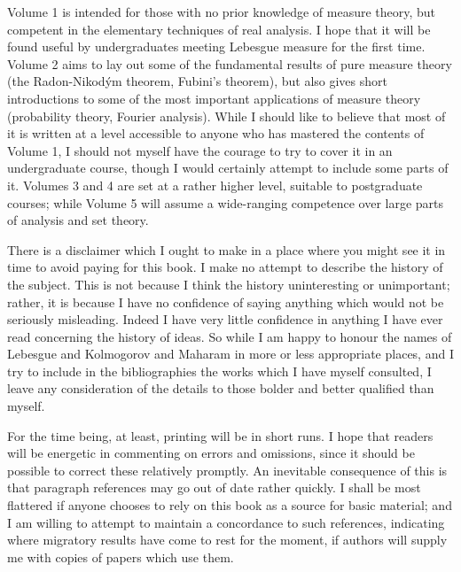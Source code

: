 \noindent Volume 1 is intended for those with no prior knowledge of
measure theory, but competent in the elementary techniques of real
analysis.  I hope that it will be found useful by undergraduates meeting
Lebesgue measure for the first time.    Volume 2 aims to lay out some of
the fundamental results of pure measure theory (the
Radon-Nikod\'ym theorem, Fubini's theorem), but also gives short
introductions to some of the most important applications of measure
theory (probability theory, Fourier analysis).   While I should like to
believe that most of it is written at a level accessible to anyone who
has mastered the contents of Volume 1, I should not myself have the
courage to try to cover it in an undergraduate course, though I would
certainly attempt to include some parts of it.   Volumes 3 and 4 are
set at a rather higher level, suitable to postgraduate courses;  while
Volume 5 will assume a wide-ranging competence over large parts of
analysis and set theory.
     
There is a disclaimer which I ought to make in a place where you might
see it in time to avoid paying for this book.   I make no attempt to
describe the history of the subject.   This is not because I think the
history uninteresting or unimportant;  rather, it is because I have no
confidence of saying anything which would not be seriously misleading.
Indeed I have very little confidence in anything I have ever read
concerning the history of ideas.   So while I am happy to honour the
names of Lebesgue and Kolmogorov and Maharam in more or less appropriate
places, and I try to include in the bibliographies the works which I
have myself consulted, I leave any consideration of the details to those
bolder and better qualified than myself.
     
For the time being, at
least, printing will be in short runs.   I hope that readers will be
energetic in commenting on errors and omissions, since it should be
possible to correct these relatively promptly.   An inevitable
consequence of this is that paragraph references may go out of date
rather quickly.   I shall be most flattered if anyone chooses to rely on
this book as a source for basic material;  and I am willing to attempt
to maintain a concordance to such references, indicating where migratory
results have come to rest for the moment, if authors will supply me with
copies of papers which use them.
     
